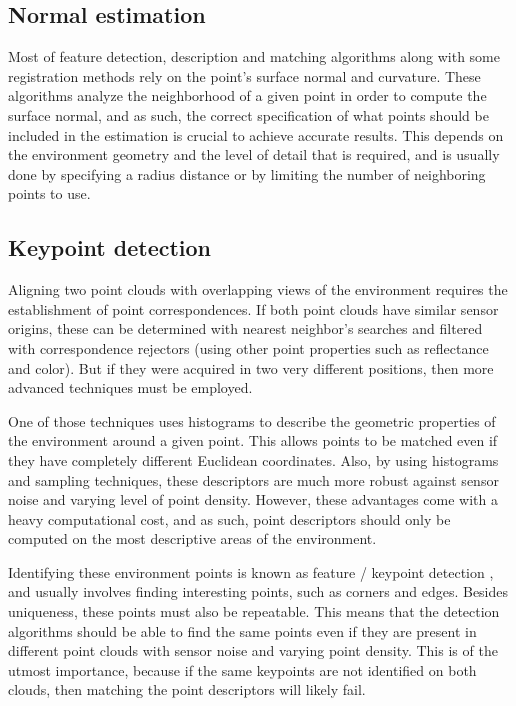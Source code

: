 \subsection{Normal estimation}

Most of feature detection, description and matching algorithms along with some registration methods rely on the point's surface normal and curvature. These algorithms analyze the neighborhood of a given point in order to compute the surface normal, and as such, the correct specification of what points should be included in the estimation is crucial to achieve accurate results. This depends on the environment geometry and the level of detail that is required, and is usually done by specifying a radius distance or by limiting the number of neighboring points to use.


\subsection{Keypoint detection}

Aligning two point clouds with overlapping views of the environment requires the establishment of point correspondences. If both point clouds have similar sensor origins, these can be determined with nearest neighbor's searches and filtered with correspondence rejectors (using other point properties such as reflectance and color). But if they were acquired in two very different positions, then more advanced techniques must be employed.

One of those techniques uses histograms to describe the geometric properties of the environment around a given point. This allows points to be matched even if they have completely different Euclidean coordinates. Also, by using histograms and sampling techniques, these descriptors are much more robust against sensor noise and varying level of point density. However, these advantages come with a heavy computational cost, and as such, point descriptors should only be computed on the most descriptive areas of the environment.

Identifying these environment points is known as feature / keypoint detection \cite{Filipe2014}, and usually involves finding interesting points, such as corners and edges. Besides uniqueness, these points must also be repeatable. This means that the detection algorithms should be able to find the same points even if they are present in different point clouds with sensor noise and varying point density. This is of the utmost importance, because if the same keypoints are not identified on both clouds, then matching the point descriptors will likely fail.


